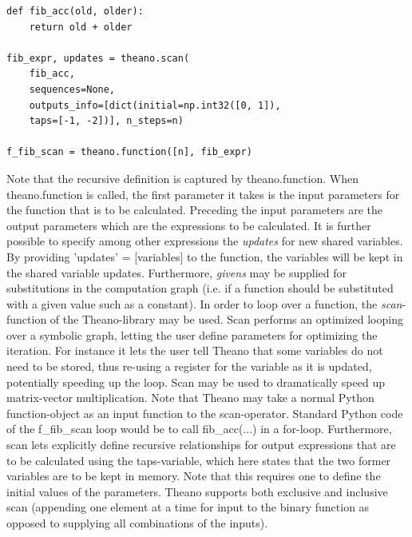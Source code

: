 \begin{verbatim}
def fib_acc(old, older):
    return old + older

fib_expr, updates = theano.scan(
    fib_acc,
    sequences=None,
    outputs_info=[dict(initial=np.int32([0, 1]), 
    taps=[-1, -2])], n_steps=n)

f_fib_scan = theano.function([n], fib_expr)
\end{verbatim}

Note that the recursive definition is captured by theano.function. When theano.function is called, the first parameter it takes is the input parameters for the function that is to be calculated. 
Preceding the input parameters are the output parameters which are the expressions to be calculated. It is further possible to specify among other expressions the \textit{updates} for new shared variables. By providing 'updates' = [variables] to the function, the variables will be kept in the shared variable updates. Furthermore, \textit{givens} may be supplied for substitutions in the computation graph (i.e. if a function should be substituted with a given value such as a constant).
In order to loop over a function, the \textit{scan}-function of the Theano-library may be used. Scan performs an optimized looping over a symbolic graph, letting the user define parameters for optimizing the iteration. For instance it lets the user tell Theano that some variables do not need to be stored, thus re-using a register for the variable as it is updated, potentially speeding up the loop. Scan may be used to dramatically speed up matrix-vector multiplication.
Note that Theano may take a normal Python function-object as an input function to the scan-operator. Standard Python code of the f\_fib\_scan loop would be to call fib\_acc(...) in a for-loop. Furthermore, scan lets explicitly define recursive relationships for output expressions that are to be calculated using the taps-variable, which here states that the two former variables are to be kept in memory. Note that this requires one to define the initial values of the parameters. Theano supports both exclusive and inclusive scan (appending one element at a time for input to the binary function as opposed to supplying all combinations of the inputs).

